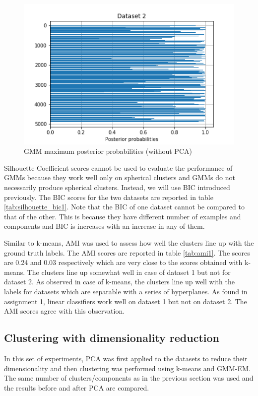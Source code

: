 \documentclass[letterpaper]{article}
\begin{document}
\begin{figure}
\begin{minipage}{.48\textwidth}
			\centering
			\includegraphics[width=.5\linewidth]{../../plots/gmm_probs_2}
			\caption{GMM maximum posterior probabilities (without PCA)}
			\label{fig:gmm_probs_viz}%
		\end{minipage}
	\end{figure}
	
	Silhouette Coefficient scores cannot be used to evaluate the performance of GMMs because they work well only on spherical clusters and GMMs do not necessarily produce spherical clusters. Instead, we will use BIC introduced previously. The BIC scores for the two datasets are reported in table \ref{tab:silhouette_bic1}. Note that the BIC of one dataset cannot be compared to that of the other. This is because they have different number of examples and components and BIC is increases with an increase in any of them.
	
	Similar to k-means, AMI was used to assess how well the clusters line up with the ground truth labels. The AMI scores are reported in table \ref{tab:ami1}. The scores are 0.24 and 0.03 respectively which are very close to the scores obtained with k-means. The clusters line up somewhat well in case of dataset 1 but not for dataset 2. As observed in case of k-means, the clusters line up well with the labels for datasets which are separable with a series of hyperplanes. As found in assignment 1, linear classifiers work well on dataset 1 but not on dataset 2. The AMI scores agree with this observation.
	
	\subsection{Clustering with dimensionality reduction}
	In this set of experiments, PCA was first applied to the datasets to reduce their dimensionality and then clustering was performed using k-means and GMM-EM. The same number of clusters/components as in the previous section was used and the results before and after PCA are compared.
	
\end{document}
